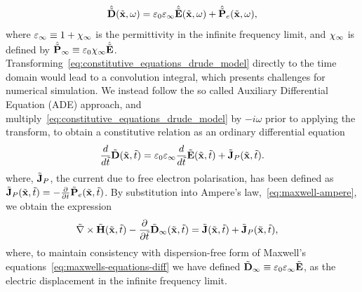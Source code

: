 \begin{equation}
\hat{\tilde{\mathbf{D}}}(\tilde{\mathbf{x}},\omega) = \varepsilon_0 \varepsilon_{\infty} \hat{\tilde{\mathbf{E}}}(\tilde{\mathbf{x}}, \omega) + \hat{\tilde{\mathbf{P}}}_e(\tilde{\mathbf{x}},\omega) ,
\end{equation}
where $\varepsilon_{\infty} \equiv 1 + \chi_{\infty} $ is the permittivity in the infinite frequency limit, and $\chi_{\infty}$ is defined by 
$\hat{\tilde{\mathbf{P}}}_{\infty} \equiv \varepsilon_0 \chi_{\infty} \hat{\tilde{\mathbf{E}}} $.
Transforming~\eqref{eq:constitutive_equations_drude_model} directly to the time
domain would lead to a convolution integral, which presents challenges for
numerical simulation\cite{kelley1996piecewise}. We instead follow the so called
Auxiliary Differential Equation (ADE)
approach\cite{Taflove:1989ds,Niegemann:2009uv,Ji:2007dl,okoniewski1997simple,kashiwa1990treatment}, and
multiply~\eqref{eq:constitutive_equations_drude_model} by $ -i \omega$ prior to
applying the transform, to obtain a constitutive relation as an ordinary differential equation
\begin{equation}
  \label{eq:constitutive_equations_drude_model_derivative_TD}
  \frac{d}{d \tilde{t}}  \tilde{\mathbf{D}} (\tilde{\mathbf{x}},\tilde{t})= \varepsilon_0 \varepsilon_{\infty} \frac{d}{d \tilde{t}}  \tilde{\mathbf{E}} (\tilde{\mathbf{x}}, \tilde{t}) + \tilde{\mathbf{J}}_P(\tilde{\mathbf{x}},\tilde{t}) .
\end{equation}
where, $\tilde{\mathbf{J}}_P$, the current due to free electron polarisation, has been
defined as $ \tilde{\mathbf{J}}_P(\tilde{\mathbf{x}},\tilde{t}) = - \frac{\partial}{\partial t} \tilde{\mathbf{P}}_e(\tilde{\mathbf{x}},\tilde{t}) $.
By substitution into Ampere's law,~\eqref{eq:maxwell-ampere}, we obtain the
expression
\begin{align}
  \tilde{\nabla} \times \tilde{\mathbf{H}}(\tilde{\mathbf{x}},\tilde{t}) - \frac{\partial}{\partial \tilde{t} } \tilde{\mathbf{D}}_{\infty}(\tilde{\mathbf{x}}, \tilde{t}) &= \tilde{\mathbf{J}}(\tilde{\mathbf{x}},\tilde{t}) + \tilde{\mathbf{J}}_P(\tilde{\mathbf{x}},\tilde{t}) , \label{eq:drude-ampere}
\end{align}
where, to maintain consistency with dispersion-free form of Maxwell's equations~\eqref{eq:maxwells-equations-diff} we have defined $\tilde{\mathbf{D}}_{\infty} \equiv \varepsilon_0 \varepsilon_{\infty} \tilde{\mathbf{E}}$, as the electric
displacement in the infinite frequency limit.

